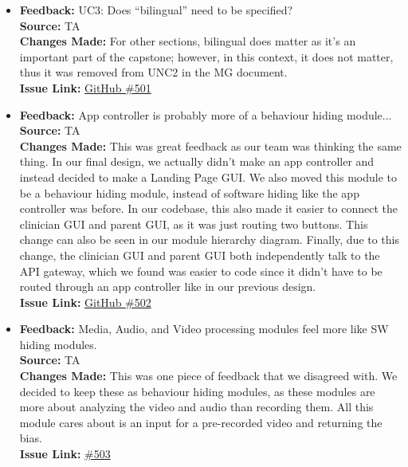 \documentclass{article}
\begin{document}
\begin{itemize}
    \item
      \textbf{Feedback:} UC3: Does “bilingual” need to be specified? \\
      \textbf{Source:} TA \\
      \textbf{Changes Made:} For other sections, bilingual does matter as it’s an important part of the capstone; however, in this context, it does not matter, thus it was removed from UNC2 in the MG document. \\
      \textbf{Issue Link:} \href{https://github.com/parishanizam/TeleHealth/issues/501}{GitHub \#501}
    
    \item
      \textbf{Feedback:} App controller is probably more of a behaviour hiding module... \\
      \textbf{Source:} TA \\
      \textbf{Changes Made:} This was great feedback as our team was thinking the same thing. In our final design, we actually didn’t make an app controller and instead decided to make a Landing Page GUI. We also moved this module to be a behaviour hiding module, instead of software hiding like the app controller was before. In our codebase, this also made it easier to connect the clinician GUI and parent GUI, as it was just routing two buttons. This change can also be seen in our module hierarchy diagram. Finally, due to this change, the clinician GUI and parent GUI both independently talk to the API gateway, which we found was easier to code since it didn’t have to be routed through an app controller like in our previous design. \\
      \textbf{Issue Link:} \href{https://github.com/parishanizam/TeleHealth/issues/502}{GitHub \#502}
    
    \item
      \textbf{Feedback:} Media, Audio, and Video processing modules feel more like SW hiding modules. \\
      \textbf{Source:} TA \\
      \textbf{Changes Made:} This was one piece of feedback that we disagreed with. We decided to keep these as behaviour hiding modules, as these modules are more about analyzing the video and audio than recording them. All this module cares about is an input for a pre-recorded video and returning the bias. \\
      \textbf{Issue Link:} \href{https://github.com/parishanizam/TeleHealth/issues/503}{\#503}
    

\end{itemize}
\end{document}
